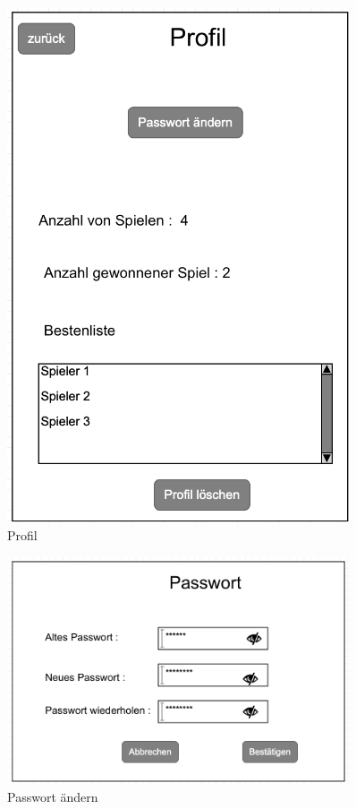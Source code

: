 \begin{figure}
	\centering
	\includegraphics[width=0.9\textwidth]{img/Profil}
	\caption{Profil}
	\label{gui:profil}
\end{figure}

\begin{figure}
	\centering
	\includegraphics[width=0.9\textwidth]{img/Passwortanderung}
	\caption{Passwort ändern}
	\label{gui:passworta}
\end{figure}


